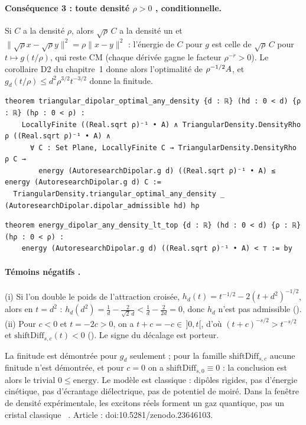 \paragraph{Conséquence 3 : toute densité $\rho>0$ \tierA, conditionnelle.} Si $C$ a la densité $\rho$, alors
$\sqrt\rho\,C$ a la densité un et $\|\sqrt\rho x-\sqrt\rho y\|^2=\rho\|x-y\|^2$ : l'énergie de $C$ pour $g$ est celle de
$\sqrt\rho\,C$ pour $t\mapsto g(t/\rho)$, qui reste CM (chaque dérivée gagne le facteur $\rho^{-r}>0$). Le corollaire D2
du chapitre~1 donne alors l'optimalité de $\rho^{-1/2}A$, et $g_d(t/\rho)\le d^2\rho^{3/2}t^{-3/2}$ donne la finitude.
\begin{leanbox}
\begin{lstlisting}[style=chdeux]
theorem triangular_dipolar_optimal_any_density {d : ℝ} (hd : 0 < d) {ρ : ℝ} (hρ : 0 < ρ) :
    LocallyFinite ((Real.sqrt ρ)⁻¹ • A) ∧ TriangularDensity.DensityRho ρ ((Real.sqrt ρ)⁻¹ • A) ∧
      ∀ C : Set Plane, LocallyFinite C → TriangularDensity.DensityRho ρ C →
        energy (AutoresearchDipolar.g d) ((Real.sqrt ρ)⁻¹ • A) ≤ energy (AutoresearchDipolar.g d) C :=
  TriangularDensity.triangular_optimal_any_density _ (AutoresearchDipolar.dipolar_admissible hd) hρ
\end{lstlisting}
\begin{lstlisting}[style=chdeux]
theorem energy_dipolar_any_density_lt_top {d : ℝ} (hd : 0 < d) {ρ : ℝ} (hρ : 0 < ρ) :
    energy (AutoresearchDipolar.g d) ((Real.sqrt ρ)⁻¹ • A) < ⊤ := by
\end{lstlisting}
\end{leanbox}

\paragraph{Témoins négatifs \tierA.} (i) Si l'on double le poids de l'attraction croisée,
$h_d(t)=t^{-1/2}-2(t+d^2)^{-1/2}$, alors en $t=d^2$ :
$h_d(d^2)=\frac1d-\frac{2}{\sqrt2\,d}<\frac1d-\frac{2}{2d}=0$, donc $h_d$ n'est pas admissible ().
(ii) Pour $c<0$ et $t=-2c>0$, on a $t+c=-c\in\,]0,t[$, d'où $(t+c)^{-s/2}>t^{-s/2}$ et
$\mathrm{shiftDiff}_{s,c}(t)<0$ (). Le signe du décalage est porteur.

\begin{warnbox}[: portée]
La finitude est démontrée pour $g_d$ seulement ; pour la famille $\mathrm{shiftDiff}_{s,c}$ aucune finitude n'est
démontrée, et pour $c=0$ on a $\mathrm{shiftDiff}_{s,0}\equiv0$ : la conclusion est alors le trivial
$0\le\mathrm{energy}$. Le modèle est classique : dipôles rigides, pas d'énergie cinétique, pas d'écrantage diélectrique,
pas de potentiel de moiré. Dans la fenêtre de densité expérimentale, les excitons réels forment un gaz quantique, pas un
cristal classique \tierC~\cite{ch2dip}. Article : doi\string:10.5281/zenodo.23646103.
\end{warnbox}

